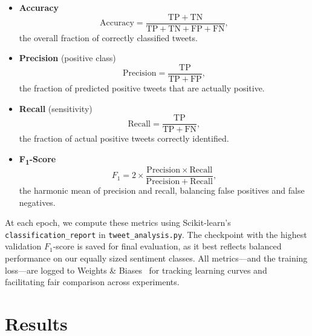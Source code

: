 \documentclass[twocolumn,superscriptaddress,aps]{revtex4-1}
\begin{document}
\begin{itemize}
  \item \textbf{Accuracy}  
    \[
      \mathrm{Accuracy}
      = \frac{\mathrm{TP} + \mathrm{TN}}{\mathrm{TP} + \mathrm{TN} + \mathrm{FP} + \mathrm{FN}},
    \]
    the overall fraction of correctly classified tweets.

  \item \textbf{Precision} (positive class)  
    \[
      \mathrm{Precision}
      = \frac{\mathrm{TP}}{\mathrm{TP} + \mathrm{FP}},
    \]
    the fraction of predicted positive tweets that are actually positive.

  \item \textbf{Recall} (sensitivity)  
    \[
      \mathrm{Recall}
      = \frac{\mathrm{TP}}{\mathrm{TP} + \mathrm{FN}},
    \]
    the fraction of actual positive tweets correctly identified.

  \item \textbf{F\textsubscript{1}-Score}  
    \[
      F_{1}
      = 2 \times \frac{\mathrm{Precision} \times \mathrm{Recall}}{\mathrm{Precision} + \mathrm{Recall}},
    \]
    the harmonic mean of precision and recall, balancing false positives and false negatives.
\end{itemize}

At each epoch, we compute these metrics using Scikit-learn’s \texttt{classification\_report} in \texttt{tweet\_analysis.py}. The checkpoint with the highest validation $F_{1}$-score is saved for final evaluation, as it best reflects balanced performance on our equally sized sentiment classes. All metrics—and the training loss—are logged to Weights \& Biases~\cite{wandb} for tracking learning curves and facilitating fair comparison across experiments.  

\section{Results}
\label{section:results}
\end{document}
